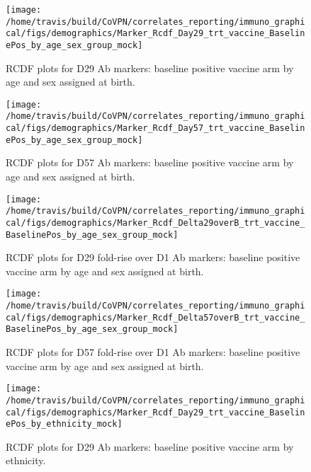 \documentclass[]{book}
\theoremstyle{definition}
\theoremstyle{definition}
\theoremstyle{definition}
\newcommand{\1}{\mathbbm{1}}
\begin{document}
\begin{figure}[H]

{\centering \texttt{[image: /home/travis/build/CoVPN/correlates\_reporting/immuno\_graphical/figs/demographics/Marker\_Rcdf\_Day29\_trt\_vaccine\_BaselinePos\_by\_age\_sex\_group\_mock]} 

}

\caption{RCDF plots for D29 Ab markers: baseline positive vaccine arm by age and sex assigned at birth.}\label{fig:unnamed-chunk-108}
\end{figure}

\begin{figure}[H]

{\centering \texttt{[image: /home/travis/build/CoVPN/correlates\_reporting/immuno\_graphical/figs/demographics/Marker\_Rcdf\_Day57\_trt\_vaccine\_BaselinePos\_by\_age\_sex\_group\_mock]} 

}

\caption{RCDF plots for D57 Ab markers: baseline positive vaccine arm by age and sex assigned at birth.}\label{fig:unnamed-chunk-109}
\end{figure}

\begin{figure}[H]

{\centering \texttt{[image: /home/travis/build/CoVPN/correlates\_reporting/immuno\_graphical/figs/demographics/Marker\_Rcdf\_Delta29overB\_trt\_vaccine\_BaselinePos\_by\_age\_sex\_group\_mock]} 

}

\caption{RCDF plots for D29 fold-rise over D1 Ab markers: baseline positive vaccine arm by age and sex assigned at birth.}\label{fig:unnamed-chunk-110}
\end{figure}

\begin{figure}[H]

{\centering \texttt{[image: /home/travis/build/CoVPN/correlates\_reporting/immuno\_graphical/figs/demographics/Marker\_Rcdf\_Delta57overB\_trt\_vaccine\_BaselinePos\_by\_age\_sex\_group\_mock]} 

}

\caption{RCDF plots for D57 fold-rise over D1 Ab markers: baseline positive vaccine arm by age and sex assigned at birth.}\label{fig:unnamed-chunk-111}
\end{figure}

\begin{figure}[H]

{\centering \texttt{[image: /home/travis/build/CoVPN/correlates\_reporting/immuno\_graphical/figs/demographics/Marker\_Rcdf\_Day29\_trt\_vaccine\_BaselinePos\_by\_ethnicity\_mock]} 

}

\caption{RCDF plots for D29 Ab markers: baseline positive vaccine arm by ethnicity.}\label{fig:unnamed-chunk-112}
\end{figure}
\end{document}
